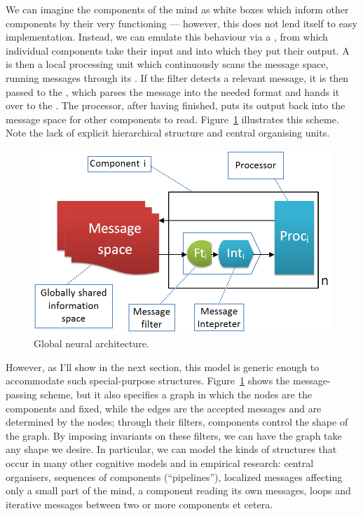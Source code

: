 We can imagine the components of the mind as white boxes which inform other components by their very functioning --- however, this does not lend itself to easy implementation. Instead, we can emulate this behaviour via a , from which individual components take their input and into which they put their output. A  is then a local processing unit which continuously scans the message space, running messages through its . If the filter detects a relevant message, it is then passed to the , which parses the message into the needed format and hands it over to the . The processor, after having finished, puts its output back into the message space for other components to read. Figure~\ref{fig:global} illustrates this scheme. Note the lack of explicit hierarchical structure and central organising units.

\begin{figure}[!h]
	\centering
	\includegraphics[width=400pt]{figs/global.png}
	\caption{Global neural architecture.}
	\label{fig:global}
\end{figure}

However, as I'll show in the next section, this model is generic enough to accommodate such special-purpose structures. Figure~\ref{fig:global} shows the message-passing scheme, but it also specifies a graph in which the nodes are the components and fixed, while the edges are the accepted messages and are determined by the nodes; through their filters, components control the shape of the graph. By imposing invariants on these filters, we can have the graph take any shape we desire. In particular, we can model the kinds of structures that occur in many other cognitive models and in empirical research: central organisers, sequences of components (``pipelines''), localized messages affecting only a small part of the mind, a component reading its own messages, loops and iterative messages between two or more components et cetera.

